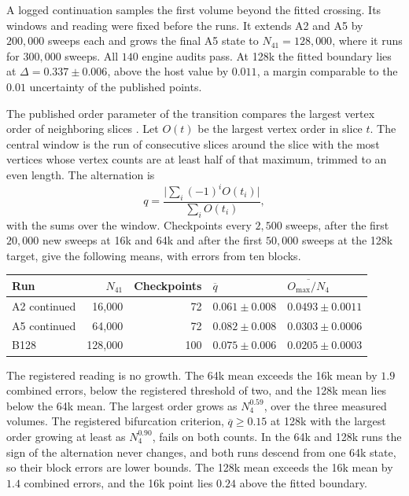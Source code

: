 A logged continuation samples the first volume beyond the fitted
crossing. Its windows and reading were fixed before the runs. It extends
A2 and A5 by $200{,}000$ sweeps each and grows the final A5 state to
$N_{41}=128{,}000$, where it runs for $300{,}000$ sweeps. All $140$ engine
audits pass. At 128k the fitted boundary lies at
$\Delta=0.337\pm0.006$, above the host value by $0.011$, a margin
comparable to the $0.01$ uncertainty of the published points.

The published order parameter of the transition compares the largest
vertex order of neighboring slices \cite{coumbe}. Let $O(t)$ be the
largest vertex order in slice $t$. The central window is the run of
consecutive slices around the slice with the most vertices whose vertex
counts are at least half of that maximum, trimmed to an even length. The
alternation is
\[
 q=\frac{\bigl|\sum_i(-1)^iO(t_i)\bigr|}{\sum_iO(t_i)},
\]
with the sums over the window. Checkpoints every $2{,}500$ sweeps, after
the first $20{,}000$ new sweeps at 16k and 64k and after the first
$50{,}000$ sweeps at the 128k target, give the following means, with
errors from ten blocks.

\begin{center}
\small
\begin{tabular}{lrrll}
\hline
Run & $N_{41}$ & Checkpoints & $\overline q$ & $\overline{O_{\max}/N_4}$\\
\hline
A2 continued & 16,000 & 72 & $0.061\pm0.008$ & $0.0493\pm0.0011$\\
A5 continued & 64,000 & 72 & $0.082\pm0.008$ & $0.0303\pm0.0006$\\
B128 & 128,000 & 100 & $0.075\pm0.006$ & $0.0205\pm0.0003$\\
\hline
\end{tabular}
\end{center}

The registered reading is no growth. The 64k mean exceeds the 16k mean by
$1.9$ combined errors, below the registered threshold of two, and the
128k mean lies below the 64k mean. The largest order grows as
$N_4^{0.59}$, over the three measured volumes. The
registered bifurcation criterion, $\overline q\geq0.15$ at 128k with the
largest order growing at least as $N_4^{0.90}$, fails on both counts. In
the 64k and 128k runs the sign of the alternation never changes, and both
runs descend from one 64k state, so their block errors are lower bounds.
The 128k mean exceeds the 16k mean by $1.4$ combined errors, and the 16k
point lies $0.24$ above the fitted boundary.

